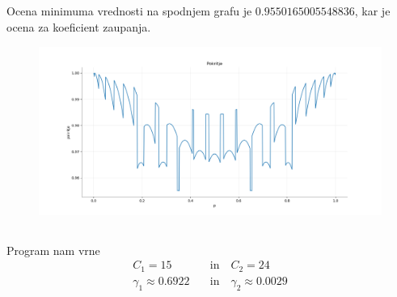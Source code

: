 \documentclass[ letterpaper, titlepage, fleqn]{article}
\begin{document}
\subsection{}
Ocena minimuma vrednosti na spodnjem grafu je $0.9550165005548836$, kar je ocena za koeficient zaupanja.
\begin{center}
\begin{figure}[h]
\includegraphics[width=18cm]{graphics/Pokritje.png}
\end{figure}
\end{center}

\subsection{}
Program nam vrne
\begin{equation*}
\begin{aligned}
C_1 = 15 \quad &\text{in} \quad C_2 = 24 \\
\gamma_1 \approx 0.6922 \quad &\text{in} \quad \gamma_2 \approx 0.0029
\end{aligned}
\end{equation*}
\end{document}
